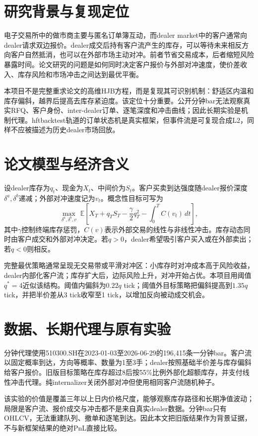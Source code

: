 \documentclass[11pt]{ctexart}
\begin{document}
\section{研究背景与复现定位}
电子交易所中的做市商主要与匿名订单簿互动，而dealer market中的客户通常向dealer请求双边报价。dealer成交后持有客户流产生的库存，可以等待未来相反方向客户自然抵消，也可以在外部市场主动对冲。前者节省交易成本，后者缩短风险暴露时间。论文研究的问题是如何同时决定客户报价与外部对冲速度，使价差收入、库存风险和市场冲击之间达到最优平衡。

本项目不是完整重求论文的高维HJB方程，而是复现其可识别机制：舒适区内温和库存偏斜，越界后提高去库存紧迫度。该定位十分重要。公开分钟bar无法观察真实RFQ、客户身份、inter-dealer订单、逐笔深度和冲击曲线；因此长期实验是机制代理。hftbacktest轨道的订单状态机是真实框架，但事件流是可复现合成L2，同样不应被描述为历史dealer市场回放。

\section{论文模型与经济含义}
设dealer库存为$q_t$、现金为$X_t$、中间价为$S_t$。客户买卖到达强度随dealer报价深度$\delta^a,\delta^b$递减；外部对冲速度记为$v_t$。概念性目标可写为
\[
\max_{\delta^a,\delta^b,v}\;\mathbb E\left[X_T+q_TS_T-\frac{\gamma}{2}q_T^2-\int_0^T C(v_t)\,dt\right],
\]
其中$\gamma$控制终端库存惩罚，$C(v)$表示外部交易的线性与非线性冲击。库存动态同时由客户成交和外部对冲决定。若$q>0$，dealer希望吸引客户买入或在外部卖出；若$q<0$则相反。

完整最优策略通常呈现无交易带或平滑对冲区：小库存时对冲成本高于风险收益，dealer内部化客户流；库存扩大后，边际风险上升，对冲开始占优。本项目用阈值$q^*=4$近似该结构。阈值内偏斜为$0.22q$ tick；阈值外目标策略把偏斜提高到$1.35q$ tick，并把半价差从3 tick收窄至1 tick，以增加反向被动成交机会。

\section{数据、长期代理与原有实验}
分钟代理使用510300.SH在2023-01-03至2026-06-29的196,415条一分钟bar。客户流以固定概率到达，方向等概率、数量为1至3手；dealer按照基础半价差与库存偏斜给客户报价。旧版目标策略在库存超过8后按55\%比例外部化超额库存，并支付线性冲击代理。纯internalizer关闭外部对冲但使用相同客户流随机种子。

该实验的价值是覆盖三年以上日内价格尺度，能够观察库存路径和长期净值波动；局限是客户流、报价成交与冲击都不是来自真实dealer数据。分钟bar只有OHLCV，无法重建队列、撤单和逐笔到达。因此本文把旧版结果作为背景证据，不与新框架结果的绝对PnL直接比较。
\end{document}
